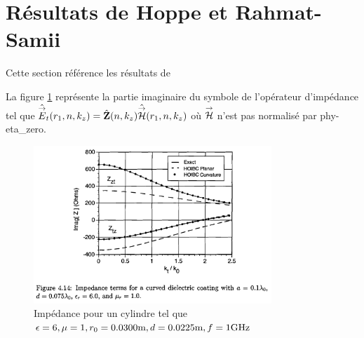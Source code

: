 \section{Résultats de Hoppe et Rahmat-Samii}

Cette section référence les résultats de \cite{hoppe_impedance_1995}


La figure \ref{fig:annex:hoppe:p62} représente la partie imaginaire du symbole de l'opérateur d'impédance tel que \( \hat{{\overset{\rightarrow}{E}}}_t(r_1,n,k_z) = \hat{\mathbf{Z}}(n,k_z) \hat{{\overset{\rightarrow}{\mathcal{H}}}}(r_1,n,k_z)\) où ${\overset{\rightarrow}{\mathcal{H}}}$ n'est pas normalisé par \gls{phy-eta_zero}.

\begin{figure}[h!tb]
    \includegraphics[width=0.8\textwidth]{images/hoppe/p62_imp_cylindre.png}
    \caption{Impédance pour un cylindre tel que \(\epsilon = 6, \mu = 1, r_0 = 0.0300\text{m}, d=0.0225\text{m}, f=1\text{GHz}\)}
    \label{fig:annex:hoppe:p62}
\end{figure}